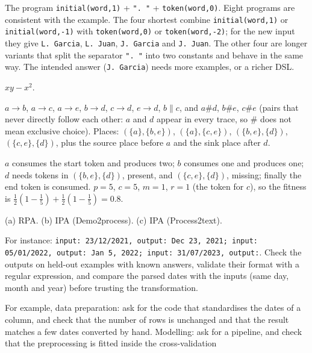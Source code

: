 \begin{description}[font=\bfseries,leftmargin=0pt,itemsep=5pt]
  \item[\ref{exr4:pbe}] The program \texttt{initial(word,1)} + \texttt{". "} + \texttt{token(word,0)}. Eight programs are consistent with the example. The four shortest combine
        \texttt{initial(word,1)} or \texttt{initial(word,-1)} with \texttt{token(word,0)} or
        \texttt{token(word,-2)}; for the new input they give \texttt{L. Garcia}, \texttt{L. Juan},
        \texttt{J. Garcia} and \texttt{J. Juan}. The other four are longer variants that split the separator \texttt{". "} into two
        constants and behave in the same way. The intended answer (\texttt{J. Garcia}) needs more examples,
        or a richer DSL.
  \item[\ref{exr4:cross}] $xy-x^2$.
  \item[\ref{exr4:alpha}] $a\rightarrow b$, $a\rightarrow c$, $a\rightarrow e$, $b\rightarrow d$, $c\rightarrow d$,
        $e\rightarrow d$, $b\parallel c$, and $a\#d$, $b\#e$, $c\#e$ (pairs that never directly follow each
        other: $a$ and $d$ appear in every trace, so $\#$ does not mean exclusive choice). Places: $(\{a\},\{b,e\})$, $(\{a\},\{c,e\})$,
        $(\{b,e\},\{d\})$, $(\{c,e\},\{d\})$, plus the source place before $a$ and the sink place after $d$.
  \item[\ref{exr4:replay}] $a$ consumes the start token and produces two; $b$ consumes one and produces one;
        $d$ needs tokens in $(\{b,e\},\{d\})$, present, and $(\{c,e\},\{d\})$, missing; finally the end token is
        consumed. $p=5$, $c=5$, $m=1$, $r=1$ (the token for $c$), so the fitness is
        $\frac12(1-\frac15)+\frac12(1-\frac15)=0.8$.
  \item[\ref{exr4:rpa}] (a) RPA. (b) IPA (Demo2process). (c) IPA (Process2text).
  \item[\ref{exr4:prompt}] For instance: \texttt{input: 23/12/2021, output: Dec 23, 2021; input: 05/01/2022,
        output: Jan 5, 2022; input: 31/07/2023, output:}. Check the outputs on held-out examples with known
        answers, validate their format with a regular expression, and compare the parsed dates with the
        inputs (same day, month and year) before trusting the transformation.
  \item[\ref{exr4:llmstage}] For example, data preparation: ask for the code that standardises the dates of a
        column, and check that the number of rows is unchanged and that the result matches a few dates converted by
        hand. Modelling: ask for a pipeline, and check that the preprocessing is fitted inside the cross-validation

\end{description}

